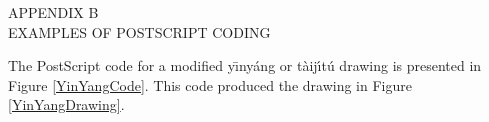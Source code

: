 %    


\thispagestyle{empty}

\null
\vspace{3.25in}
\begin{center}
  APPENDIX B \\
  EXAMPLES OF POSTSCRIPT CODING
\end{center}
\newpage

\thispagestyle{plain} 




The PostScript code for 
a modified y\={\i}ny\'{a}ng or  t\`{a}ij\'{\i}t\'{u} drawing 
is presented in  Figure \ref{YinYangCode}.  This code 
produced the drawing in Figure \ref{YinYangDrawing}.  

